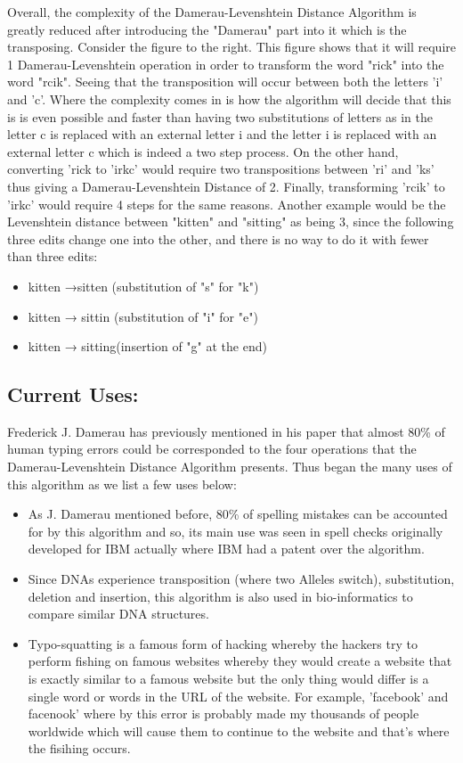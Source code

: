 \documentclass[12pt]{article}
\begin{document}
    Overall, the complexity of the Damerau-Levenshtein Distance Algorithm is greatly reduced after introducing the "Damerau" part into it which is the transposing. Consider the figure to the right. This figure shows that it will require 1 Damerau-Levenshtein operation in order to transform the word "rick" into the word "rcik". Seeing that the transposition will occur between both the letters 'i' and 'c'. Where the complexity comes in is how the algorithm will decide that this is is even possible and faster than having two substitutions of letters as in the letter c is replaced with an external letter i and the letter i is replaced with an external letter c which is indeed a two step process. On the other hand, converting 'rick to 'irkc' would require two transpositions between 'ri' and 'ks' thus giving a  Damerau-Levenshtein Distance of 2. Finally, transforming 'rcik' to 'irkc' would require 4 steps for the same reasons. Another example would be the Levenshtein distance between "kitten" and "sitting" as being 3, since the following three edits change one into the other, and there is no way to do it with fewer than three edits:

\begin{itemize}
\item kitten →sitten (substitution of "s" for "k")
\item kitten → sittin (substitution of "i" for "e")
\item kitten → sitting(insertion of "g" at the end) \cite{wiki1} 
\end{itemize}

\subsection*{Current Uses:}
Frederick J. Damerau has previously mentioned in his paper that almost 80\%{} of human typing errors could be corresponded to the four operations that the Damerau-Levenshtein Distance Algorithm presents. Thus began the many uses of this algorithm as we list a few uses below:

\begin{itemize}
\item As J. Damerau mentioned before, 80\%{} of spelling mistakes can be accounted for by this algorithm and so, its main use was seen in spell checks originally developed for IBM actually where IBM had a patent over the algorithm. \cite{book} 
\item Since DNAs experience transposition (where two Alleles switch), substitution, deletion and insertion, this algorithm is also used in bio-informatics to compare similar DNA structures. \cite{article} 
\item Typo-squatting is a famous form of hacking whereby the hackers try to perform fishing on famous websites whereby they would create a website that is exactly similar to a famous website but the only thing would differ is a single word or words in the URL of the website. For example, 'facebook' and facenook' where by this error is probably made my thousands of people worldwide which will cause them to continue to the website and that's where the fisihing occurs. \cite{book2} 
\end{itemize}
\end{document}

